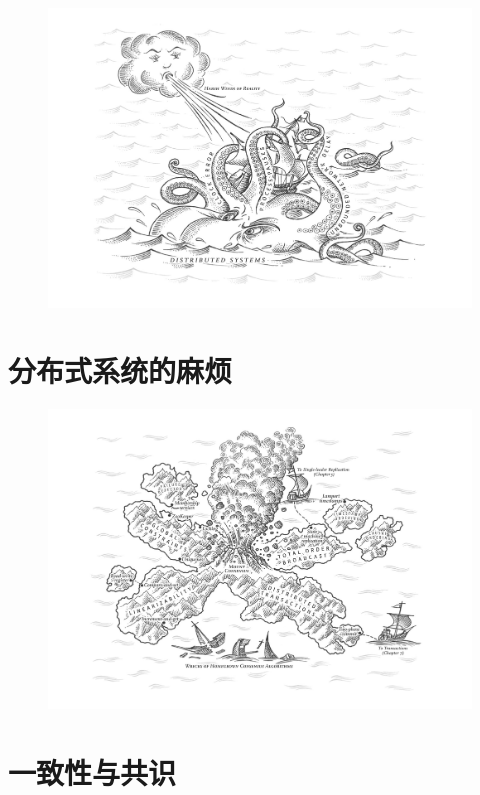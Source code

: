 \documentclass{book}
\begin{document}
\newpage
\begin{figure}
  \centering
  \includegraphics[width=\textwidth]{img/ch8.png}
  \label{fig:ch8}
\end{figure}

\chapter{分布式系统的麻烦}
\label{ch:ch8}

\newpage
\begin{figure}
  \centering
  \includegraphics[width=\textwidth]{img/ch9.png}
  \label{fig:ch9}
\end{figure}

\chapter{一致性与共识}
\label{ch:ch9}
\end{document}
